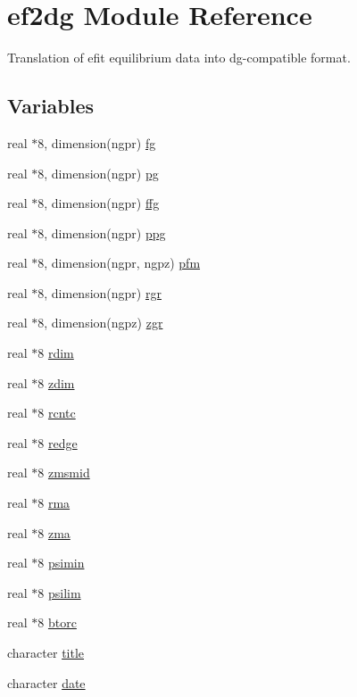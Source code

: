\hypertarget{namespaceef2dg}{
\section{ef2dg Module Reference}
\label{namespaceef2dg}
}
Translation of efit equilibrium data into dg-compatible format.  


\subsection*{Variables}
\begin{CompactItemize}
\item 
real $\ast$8, dimension(ngpr) \hyperlink{namespaceef2dg_c2f458f8ca8817889844012157d9c449}{fg}
\item 
real $\ast$8, dimension(ngpr) \hyperlink{namespaceef2dg_507db5a901c6ff6e8b80ace4211efd3d}{pg}
\item 
real $\ast$8, dimension(ngpr) \hyperlink{namespaceef2dg_9fdb7b146d76ce136d172e5be1672df2}{ffg}
\item 
real $\ast$8, dimension(ngpr) \hyperlink{namespaceef2dg_b55b4db9b403180fe2861c7cd43c98c8}{ppg}
\item 
real $\ast$8, dimension(ngpr, ngpz) \hyperlink{namespaceef2dg_04b90c623a3316539f8336b49bc8c3b7}{pfm}
\item 
real $\ast$8, dimension(ngpr) \hyperlink{namespaceef2dg_45656eca6a7e6c845eddb72e77912e0a}{rgr}
\item 
real $\ast$8, dimension(ngpz) \hyperlink{namespaceef2dg_e89bb2455ad1b4ab57df511af6651cea}{zgr}
\item 
real $\ast$8 \hyperlink{namespaceef2dg_cd4de75f2280fe818a45a15f136abde5}{rdim}
\item 
real $\ast$8 \hyperlink{namespaceef2dg_b82c3339f920d26c7fabe95ce9f384ae}{zdim}
\item 
real $\ast$8 \hyperlink{namespaceef2dg_5bd161d0c4b9da7f1d03adaa1d39ad06}{rcntc}
\item 
real $\ast$8 \hyperlink{namespaceef2dg_40641084d368b57d08ee7f6ac8ffcd4a}{redge}
\item 
real $\ast$8 \hyperlink{namespaceef2dg_4061e999562aae54b6b48dfafd56c64d}{zmsmid}
\item 
real $\ast$8 \hyperlink{namespaceef2dg_c32e940221a1012d9bd4361686553399}{rma}
\item 
real $\ast$8 \hyperlink{namespaceef2dg_4bfe1ad02972fee5ac5227dee3e60116}{zma}
\item 
real $\ast$8 \hyperlink{namespaceef2dg_c809d7b04339100feba4f34562cc7305}{psimin}
\item 
real $\ast$8 \hyperlink{namespaceef2dg_11687c59dc99e16fd6d50fabc43ee8d9}{psilim}
\item 
real $\ast$8 \hyperlink{namespaceef2dg_bde8579d29ca683a349db8d85ee0e0ae}{btorc}
\item 
character \hyperlink{namespaceef2dg_563527db7cfae449ff7b79b8c5317a7e}{title}
\item 
character \hyperlink{namespaceef2dg_06957f7e895cba235575abf88aff14d4}{date}
\end{CompactItemize}


